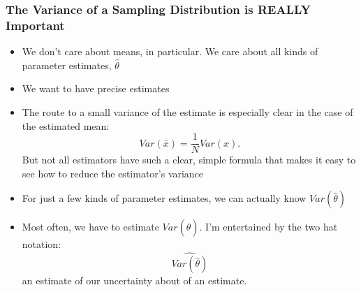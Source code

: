 \documentclass[10pt,english]{beamer}
\begin{document}
 \begin{frame}[allowframebreaks]
   \frametitle{The Variance of a Sampling Distribution is REALLY Important}
   \begin{itemize}

   \item We don't care about means, in particular. We care about
     all kinds of parameter estimates, $\hat{\theta}$

   \item We want to have precise estimates

   \item The route to a small variance of the estimate is especially
     clear in the case of the estimated mean:
     \begin{displaymath}
       Var(\bar{x}) = \frac{1}{N}Var(x).
     \end{displaymath}
     But not all estimators have such a clear, simple
     formula that makes it easy to see how to reduce the estimator's variance







   \item For just a few kinds of parameter estimates, we can actually
     know  $Var(\hat{\theta})$

   \item Most often, we have to estimate $Var(\hat{\theta})$. I'm
     entertained by the two hat notation:
     \begin{displaymath}
      \widehat{Var(\hat{\theta})}
    \end{displaymath}
    an estimate of our uncertainty about of an estimate.


\end{itemize}
\end{frame}
\end{document}
